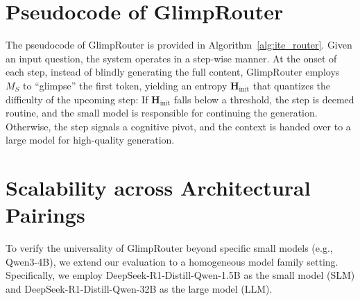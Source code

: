 \documentclass[11pt]{article}
\newcommand{\approach}{{GlimpRouter}\xspace}
\begin{document}
% 





\appendix

\vspace{10pt}
\section{Pseudocode of \approach}
\label{app:alg}

The pseudocode of \approach is provided in Algorithm~\ref{alg:ite_router}.
Given an input question, the system operates in a step-wise manner. At the onset of each step, instead of blindly generating the full content, \approach employs $M_S$ to ``glimpse'' the first token, yielding an entropy $\mathbf{H}_\text{init}$ that quantizes the difficulty of the upcoming step: 
If $\mathbf{H}_\text{init}$ falls below a threshold, the step is deemed routine, and the small model is responsible for continuing the generation.
Otherwise, the step signals a cognitive pivot, and the context is handed over to a large model for high-quality generation.








\section{Scalability across Architectural Pairings}
\label{app:scalability}

To verify the universality of \approach beyond specific small models (e.g., Qwen3-4B), we extend our evaluation to a homogeneous model family setting. Specifically, we employ DeepSeek-R1-Distill-Qwen-1.5B as the small model (SLM) and DeepSeek-R1-Distill-Qwen-32B as the large model (LLM). 
\end{document}
